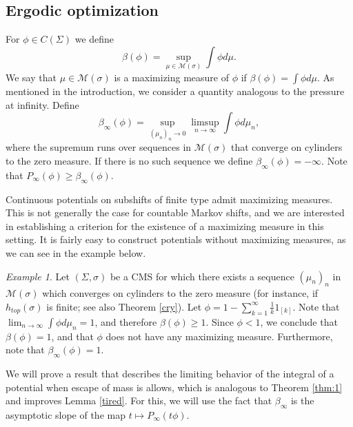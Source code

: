 \documentclass[letterpaper,11pt]{amsart}
\theoremstyle{plain}
\theoremstyle{plain}
\theoremstyle{definition}
\theoremstyle{remark}
\newtheorem{example}{Example}
\def\M{{\mathcal M}}
\begin{document}

\subsection{Ergodic optimization} For $\phi \in C(\Sigma)$ we define $$\beta(\phi )=\sup_{\mu\in \M(\sigma)}\int \phi d\mu.$$ We say that $\mu\in \M(\sigma)$ is a maximizing measure of $\phi $ if $\beta(\phi )=\int \phi d\mu$. As mentioned in the introduction, we consider a quantity analogous to the pressure at infinity. Define
$$\beta_\infty(\phi)=\sup_{(\mu_n)_n\to 0}\limsup_{n\to\infty} \int \phi d\mu_n,$$
where the supremum runs over sequences in $\M(\sigma)$ that converge on cylinders to the zero measure. If there is no such sequence we define $\beta_\infty(\phi)=-\infty$.  Note that  $P_\infty(\phi)\ge \beta_\infty(\phi)$.

Continuous potentials on subshifts of finite type admit maximizing measures. This is not generally the case for countable Markov shifts, and we are interested in establishing a criterion for the existence of a maximizing measure in this setting. It is fairly easy to construct potentials without maximizing measures, as we can see in the example below.

\begin{example}\label{ex:nomea} Let $(\Sigma,\sigma)$ be a CMS for which there exists a sequence $(\mu_n)_n$ in $\M(\sigma)$ which converges on cylinders to the zero measure (for instance,  if $h_{top}(\sigma)$ is finite; see also Theorem \ref{cry}). Let $\phi=1-\sum_{k=1}^\infty \frac{1}{k}1_{[k]}$. Note that $\lim_{n\to\infty}\int \phi d\mu_n=1$, and therefore $\beta(\phi)\ge 1.$ Since $\phi<1$, we conclude that $\beta(\phi)=1$, and that $\phi$ does not have any maximizing measure. Furthermore, note that $\beta_\infty(\phi)=1$. 
\end{example}

We will prove a result that describes the limiting behavior of the integral of a potential when escape of mass is allows, which is analogous to Theorem \ref{thm:1} and improves Lemma \ref{tired}. For this, we will use the fact that  $\beta_\infty$ is the asymptotic slope of the map $t\mapsto P_\infty(t\phi)$.
\end{document}

